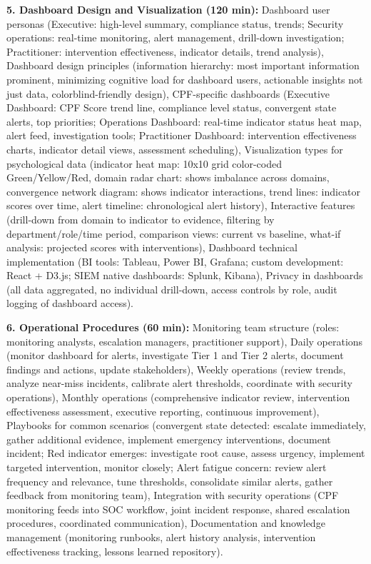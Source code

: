\documentclass[11pt,a4paper]{article}
\begin{document}
\textbf{5. Dashboard Design and Visualization (120 min):} Dashboard user personas (Executive: high-level summary, compliance status, trends; Security operations: real-time monitoring, alert management, drill-down investigation; Practitioner: intervention effectiveness, indicator details, trend analysis), Dashboard design principles (information hierarchy: most important information prominent, minimizing cognitive load for dashboard users, actionable insights not just data, colorblind-friendly design), CPF-specific dashboards (Executive Dashboard: CPF Score trend line, compliance level status, convergent state alerts, top priorities; Operations Dashboard: real-time indicator status heat map, alert feed, investigation tools; Practitioner Dashboard: intervention effectiveness charts, indicator detail views, assessment scheduling), Visualization types for psychological data (indicator heat map: 10x10 grid color-coded Green/Yellow/Red, domain radar chart: shows imbalance across domains, convergence network diagram: shows indicator interactions, trend lines: indicator scores over time, alert timeline: chronological alert history), Interactive features (drill-down from domain to indicator to evidence, filtering by department/role/time period, comparison views: current vs baseline, what-if analysis: projected scores with interventions), Dashboard technical implementation (BI tools: Tableau, Power BI, Grafana; custom development: React + D3.js; SIEM native dashboards: Splunk, Kibana), Privacy in dashboards (all data aggregated, no individual drill-down, access controls by role, audit logging of dashboard access).

\textbf{6. Operational Procedures (60 min):} Monitoring team structure (roles: monitoring analysts, escalation managers, practitioner support), Daily operations (monitor dashboard for alerts, investigate Tier 1 and Tier 2 alerts, document findings and actions, update stakeholders), Weekly operations (review trends, analyze near-miss incidents, calibrate alert thresholds, coordinate with security operations), Monthly operations (comprehensive indicator review, intervention effectiveness assessment, executive reporting, continuous improvement), Playbooks for common scenarios (convergent state detected: escalate immediately, gather additional evidence, implement emergency interventions, document incident; Red indicator emerges: investigate root cause, assess urgency, implement targeted intervention, monitor closely; Alert fatigue concern: review alert frequency and relevance, tune thresholds, consolidate similar alerts, gather feedback from monitoring team), Integration with security operations (CPF monitoring feeds into SOC workflow, joint incident response, shared escalation procedures, coordinated communication), Documentation and knowledge management (monitoring runbooks, alert history analysis, intervention effectiveness tracking, lessons learned repository).
\end{document}
